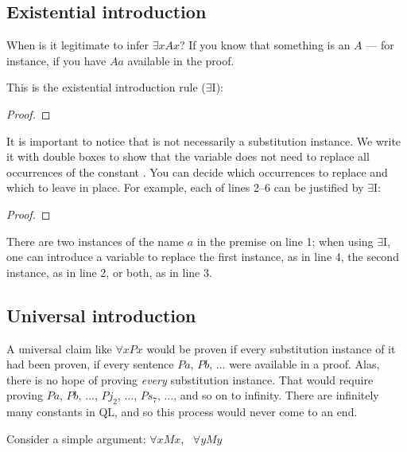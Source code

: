 \subsection{Existential introduction}

When is it legitimate to infer $\exists x Ax$? If you know that something is an $A$ --- for instance, if you have $Aa$ available in the proof.

This is the existential introduction rule ($\exists$I):

\begin{proof}
	 
\end{proof}

It is important to notice that \metaA{} is not necessarily a substitution instance. We write it with double boxes to show that the variable  does not need to replace all occurrences of the constant . You can decide which occurrences to replace and which to leave in place. For example, each of lines 2--6 can be justified by $\exists${}I:


\begin{proof}
	 
	 
	 
	 
	 
\end{proof}

There are two instances of the name $a$ in the premise on line 1; when using $\exists${}I, one can introduce a variable to replace the first instance, as in line 4, the second instance, as in line 2, or both, as in line 3.

\subsection{Universal introduction}
A universal claim like $\forall x Px$ would be proven if {every} substitution instance of it had been proven, if every sentence $Pa$, $Pb$, $\ldots$ were available in a proof. Alas, there is no hope of proving \emph{every} substitution instance. That would require proving $Pa$, $Pb$, $\ldots$, $Pj_2$, $\ldots$, $Ps_7$, $\ldots$, and so on to infinity. There are infinitely many constants in QL, and so this process would never come to an end.

Consider a simple argument: $\forall x Mx$, \therefore\ $\forall y My$

